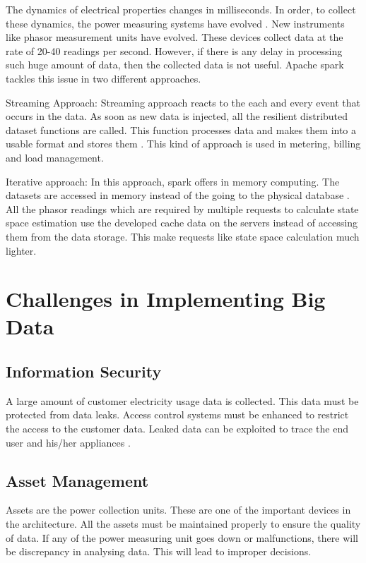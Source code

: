 \documentclass[sigconf]{acmart}
\begin{document}
The dynamics of electrical properties changes in milliseconds. In order, to collect these dynamics, the power measuring systems  have evolved . New instruments like phasor measurement units have evolved. These devices collect data at the rate of 20-40 readings per second. However, if there is any delay in processing such huge amount of data, then the collected data is not useful. Apache spark tackles this issue in two different approaches.

Streaming Approach: Streaming approach reacts to the each and every event that occurs in the data. As soon as new data is injected, all the resilient distributed dataset functions are called. This function processes data and makes them into a usable format and stores them \cite{Zaharia}. This kind of approach is used in metering, billing and load management. 

Iterative approach: In this approach, spark offers in memory computing. The datasets are accessed in memory instead of the going to the physical database \cite{2013}. All the phasor readings which are required by multiple requests to calculate state space estimation use the developed cache data on the servers instead of accessing them from the data storage. This make requests like state space calculation much lighter.

\section{Challenges in Implementing Big Data}
\subsection{Information Security}
A large amount of customer electricity usage data is collected. This data must be protected from data leaks. Access control systems must be enhanced to restrict the access to the customer data. Leaked data can be exploited to trace the end user and his/her appliances \cite{Yu}.

\subsection{Asset Management}
Assets are the power collection units. These are one of the important devices in the architecture. All the assets must be maintained properly to ensure the quality of data. If any of the power measuring unit goes down or malfunctions, there will be discrepancy in analysing data. This will lead to improper decisions.
\end{document}
